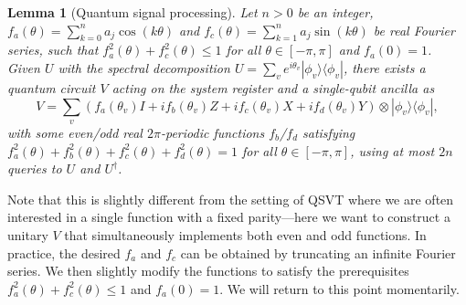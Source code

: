 \documentclass[letterpaper,onecolumn,11pt,accepted=2026-02-14]{quantumarticle}
\newtheorem{lemma}{Lemma}
\theoremstyle{remark}
\theoremstyle{plain}
\newcommand{\ket}[1]{|#1\rangle}
\newcommand{\bra}[1]{\langle#1|}
\newcommand{\ketbra}[2]{\ket{#1}\!\bra{#2}}
\begin{document}
\begin{lemma}[Quantum signal processing]
\label{lem:qsp}
Let $n>0$ be an integer, $f_a(\theta)=\sum_{k=0}^{n}a_j\cos(k\theta)$ and $f_c(\theta)=\sum_{k=1}^{n}a_j\sin(k\theta)$ be real Fourier series, such that $f_a^2(\theta)+f_c^2(\theta)\leq 1$ for all $\theta\in[-\pi,\pi]$ and $f_a(0)=1$. Given $U$ with the spectral decomposition $U=\sum_ve^{i\theta_v}\ketbra{\phi_v}{\phi_v}$, there exists a quantum circuit $V$ acting on the system register and a single-qubit ancilla as
\begin{equation}
    V=\sum_v \left(f_{a}(\theta_v)I+if_{b}(\theta_v)Z+if_{c}(\theta_v)X+if_{d}(\theta_v)Y\right)\otimes\ketbra{\phi_v}{\phi_v},
\end{equation}
with some even/odd real $2\pi$-periodic functions $f_b$/$f_d$ satisfying $f_{a}^2(\theta)+f_{b}^2(\theta)+f_{c}^2(\theta)+f_{d}^2(\theta)=1$ for all $\theta\in[-\pi,\pi]$, using at most $2n$ queries to $U$ and $U^\dagger$.
\end{lemma}

Note that this is slightly different from the setting of QSVT where we are often interested in a single function with a fixed parity---here we want to construct a unitary $V$ that simultaneously implements both even and odd functions.
In practice, the desired $f_a$ and $f_c$ can be obtained by truncating an infinite Fourier series. We then slightly modify the functions to satisfy the prerequisites $f_a^2(\theta)+f_c^2(\theta)\leq 1$ and $f_a(0)=1$. We will return to this point momentarily.
\end{document}
